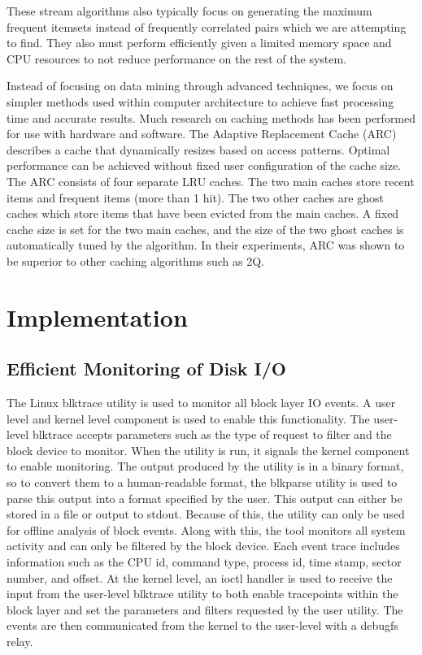 \documentclass[MEng]{uofl}
\begin{document}
These stream algorithms also typically focus on generating the maximum frequent itemsets instead of frequently correlated pairs which we are attempting to find. They also must perform efficiently given a limited memory space and CPU resources to not reduce performance on the rest of the system. 

Instead of focusing on data mining through advanced techniques, we focus on simpler methods used within computer architecture to achieve fast processing time and accurate results. Much research on caching methods has been performed for use with hardware and software. The Adaptive Replacement Cache (ARC) describes a cache that dynamically resizes based on access patterns. Optimal performance can be achieved without fixed user configuration of the cache size. The ARC consists of four separate LRU caches. The two main caches store recent items and frequent items (more than 1 hit). The two other caches are ghost caches which store items that have been evicted from the main caches. A fixed cache size is set for the two main caches, and the size of the two ghost caches is automatically tuned by the algorithm. In their experiments, ARC was shown to be superior to other caching algorithms such as 2Q.



\chapter{Implementation}

\section{Efficient Monitoring of Disk I/O}
The Linux blktrace utility is used to monitor all block layer IO events. A user level and kernel level component is used to enable this functionality. The user-level blktrace accepts parameters such as the type of request to filter and the block device to monitor. When the utility is run, it signals the kernel component to enable monitoring. The output produced by the utility is in a binary format, so to convert them to a human-readable format, the blkparse utility is used to parse this output into a format specified by the user. This output can either be stored in a file or output to stdout. Because of this, the utility can only be used for offline analysis of block events. Along with this, the tool monitors all system activity and can only be filtered by the block device. Each event trace includes information such as the CPU id, command type, process id, time stamp, sector number, and offset. At the kernel level, an ioctl handler is used to receive the input from the user-level blktrace utility to both enable tracepoints within the block layer and set the parameters and filters requested by the user utility. The events are then communicated from the kernel to the user-level with a debugfs relay. 
\end{document}
